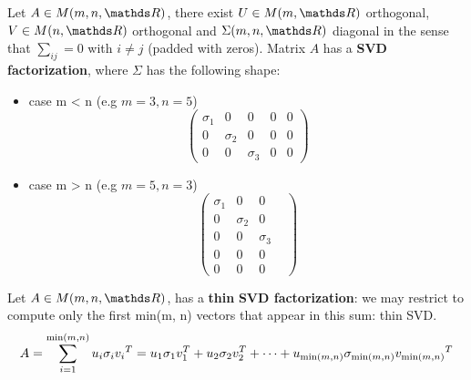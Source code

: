 \documentclass[ComputationalMathematics.tex]{subfiles}
\begin{document}
\begin{definition}
  Let $A \in M(m, n, \R)$, there exist $U \in M(m, \R)$ orthogonal, $V \in M(n, \R)$ orthogonal and $\Sigma(m, n, \R)$ diagonal in the sense that $\sum_{ij} = 0$ with $i \neq j$ (padded with zeros). Matrix $A$  has a \textbf{SVD factorization}, where $\Sigma$ has the following shape:
  \begin{itemize}
      \item case m < n  (e.g $m=3, n=5$)
        \[
          \begin{pmatrix}
            \sigma_1&0&0&0&0\\
            0& \sigma_2&0&0&0\\
            0&0&\sigma_3&0&0
          \end{pmatrix}
        \]
        
        \item  case m > n (e.g $m=5, n=3$)
        \[
          \begin{pmatrix}
            \sigma_1&0&0&\\
            0& \sigma_2&0&\\
            0&0&\sigma_3&\\
            0&0&0\\
            0&0&0
          \end{pmatrix}
        \]
  \end{itemize}

\end{definition}

\begin{definition}
  Let $A \in M(m, n, \R)$,   has a \textbf{thin} \textbf{SVD factorization}:  we may restrict to compute only the first min(m, n)
vectors that appear in this sum: thin SVD.
  \[
    A = \sum\limits_{i=1}^{\min(m, n)} u_i \sigma_i {v_i}^{T} = u_1 \sigma_1 v_1^T + u_2 \sigma_2 v_2^T + \cdots + u_{\min(m,n)} \sigma_{\min(m,n)} {v_{\min(m,n)}}^{T}
  \]
\end{definition}

\end{document}
